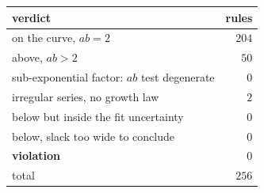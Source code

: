 \begin{tabular}{lr}
\hline
verdict & rules \\
\hline
on the curve, $ab=2$ & $204$ \\
above, $ab>2$ & $50$ \\
sub-exponential factor: $ab$ test degenerate & $0$ \\
irregular series, no growth law & $2$ \\
below but inside the fit uncertainty & $0$ \\
below, slack too wide to conclude & $0$ \\
\textbf{violation} & $0$ \\
\hline
total & $256$ \\
\hline
\end{tabular}
